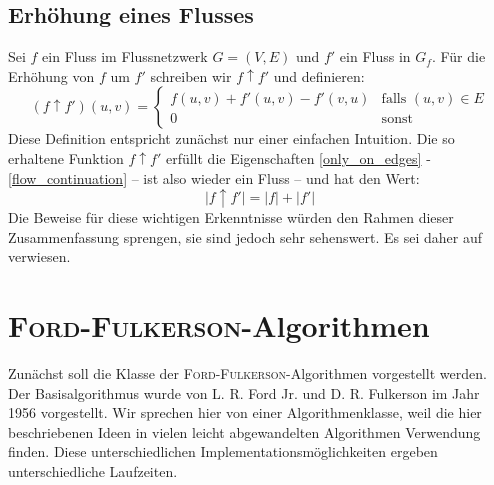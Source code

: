 \documentclass[12pt,a4paper,titlepage,onecolumn,ngerman]{scrartcl}
\theoremstyle{definition}
\theoremstyle{remark}
\newcommand{\ff}{\textsc{Ford-Fulkerson}}
\begin{document}
\subsection{Erhöhung eines Flusses}
Sei $f$ ein Fluss im Flussnetzwerk $G = (V,E)$ und $f'$ ein Fluss in $G_f$.
Für die Erhöhung von $f$ um $f'$ schreiben wir $f \uparrow f'$ und definieren:
\begin{equation}
    (f \uparrow f')(u,v)=
    \begin{cases}
    f(u,v) + f'(u,v) - f'(v,u) & \text{falls $(u,v) \in E$}\\
    0 & \text{sonst}
    \end{cases}
\end{equation}
Diese Definition entspricht zunächst nur einer einfachen Intuition.
\medbreak
Die so erhaltene Funktion $f\uparrow f'$ erfüllt die Eigenschaften \eqref{only_on_edges} - \eqref{flow_continuation} -- ist also wieder ein Fluss -- und hat den Wert:
\begin{equation}\label{flow_incr}
    \lvert f\uparrow f' \rvert = \lvert f \rvert + \lvert f'\rvert
\end{equation}
Die Beweise für diese wichtigen Erkenntnisse würden den Rahmen dieser Zusammenfassung sprengen, sie sind jedoch sehr sehenswert.
Es sei daher auf \cite[][S. 730-732]{Cormen09} verwiesen.


\section{\ff -Algorithmen}
Zunächst soll die Klasse der \ff -Algorithmen vorgestellt werden.
Der Basisalgorithmus wurde von L. R. Ford Jr. und D. R. Fulkerson im Jahr 1956 vorgestellt.
Wir sprechen hier von einer Algorithmenklasse, weil die hier beschriebenen Ideen in vielen leicht abgewandelten Algorithmen Verwendung finden.
Diese unterschiedlichen Implementationsmöglichkeiten ergeben unterschiedliche Laufzeiten.
\end{document}
